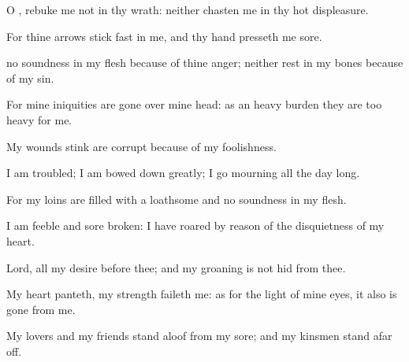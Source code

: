 {\Q {}O
{},
rebuke me not in thy
wrath: neither
chasten me in thy hot
displeasure.


\par }{\Q {}For thine
arrows stick
fast in me, and thy
hand presseth me
sore.


\par }{\Q {} no
soundness in my
flesh
because of thine
anger; neither
{}
rest in my
bones
because of my
sin.


\par }{\Q {}For mine
iniquities are gone
over mine
head: as an
heavy
burden they are too
heavy for me.


\par }{\Q {}My
wounds
stink
{} are
corrupt
because of my
foolishness.


\par }{\Q {}I am
troubled; I am bowed
down
greatly; I
go
mourning all the
day long.


\par }{\Q {}For my
loins are
filled with a
loathsome
{} and
{} no
soundness in my
flesh.


\par }{\Q {}I am
feeble and
sore
broken: I have
roared by reason of the
disquietness of my
heart.


\par }{\Q {}Lord, all my
desire
{} before thee; and my
groaning is not
hid from thee.


\par }{\Q {}My
heart
panteth, my
strength
faileth me: as for the
light of mine
eyes,
it also is
gone from me.


\par }{\Q {}My
lovers and my
friends
stand aloof
from my
sore; and my
kinsmen
stand afar
off.


\par }{\BB \par }
